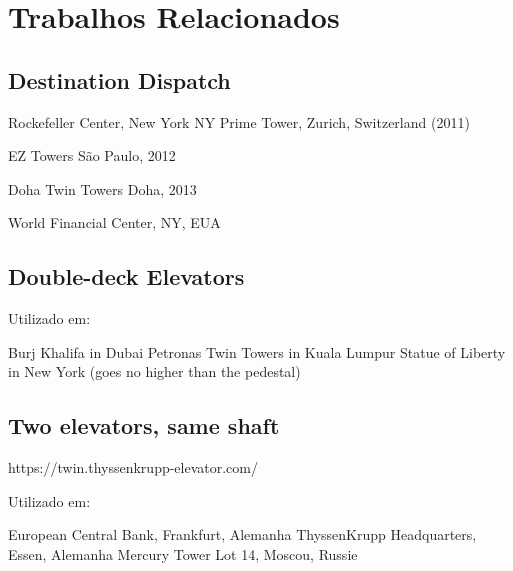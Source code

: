 \chapter{\label{chap:related}Trabalhos Relacionados}

\section{Destination Dispatch}


Rockefeller Center, New York NY
Prime Tower, Zurich, Switzerland (2011)


EZ Towers
São Paulo, 2012

Doha Twin Towers
Doha, 2013


World Financial Center, NY, EUA

\section{Double-deck Elevators}


Utilizado em:

Burj Khalifa in Dubai
Petronas Twin Towers in Kuala Lumpur
Statue of Liberty in New York (goes no higher than the pedestal)

\section{Two elevators, same shaft}

https://twin.thyssenkrupp-elevator.com/

Utilizado em:

European Central Bank, Frankfurt, Alemanha
ThyssenKrupp Headquarters, Essen, Alemanha
Mercury Tower Lot 14, Moscou, Russie